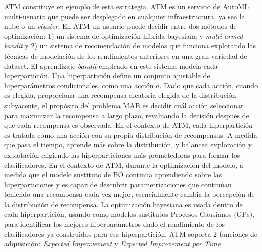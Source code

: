 ATM \cite{swearingen2017atm} constituye en ejemplo de esta estrategia. ATM es un servicio de AutoML multi-usuario que puede ser desplegado en cualquier infraestructura, ya sea la nube o un \textit{cluster}. En ATM un usuario puede decidir entre dos métodos de optimización: 1) un sistema de optimización híbrida bayesiana y \textit{multi-armed bandit} y 2) un sistema de recomendación de modelos que funciona explotando las técnicas de modelación de los rendimientos anteriores en una gran variedad de dataset. El aprendizaje \textit{bandit} empleado en este sistema modela cada hiperpartición. Una hiperpartición define un conjunto ajustable de hiperparámetros condicionales, como una acción $a$. Dado que cada acción, cuando es elegida, proporciona una recompensa aleatoria elegida de la distribución subyacente, el propósito del problema MAB es decidir cuál acción seleccionar para maximizar la recompensa a largo plazo, revaluando la decisión después de que cada recompensa es observada. En el contexto de ATM, cada hiperpartición es tratada como una acción con su propia distribución de recompensas. A medida que pasa el tiempo, aprende más sobre la distribución, y balancea exploración y explotación eligiendo las hiperparticiones más prometedoras para formar los clasificadores. En el contexto de ATM, durante la optimización del modelo, a medida que el modelo sustituto de BO continua aprendiendo sobre las hiperparticiones y es capaz de descubrir parametrizaciones que continúan teniendo una recompensa cada vez mejor, esencialmente cambia la percepción de la distribución de recompensa. La optimización bayesiana es usada dentro de cada hiperpartición, usando como modelos sustitutos Procesos Gausianos (GPs), para identificar los mejores hiperparámetros dado el rendimiento de los clasificadores ya construidos para esa hiperpartición. ATM soporta 2 funciones de adquisición: \textit{Expected Improvement} y \textit{Expected Improvement per Time} \cite{snoek2012practical}.

